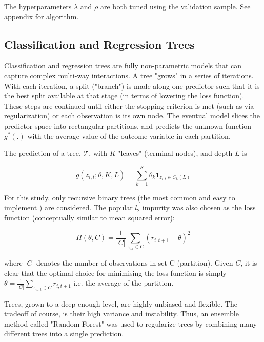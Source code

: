 \documentclass[man, a4paper, biblatex]{article}
\newcommand{\smalltodo}[2][] {\todo[caption={#2}, size=\scriptsize,%
	fancyline,#1]{\begin{spacing}{.5}#2\end{spacing}}}
\newcommand{\rhs}[2][]{\smalltodo[color=green!30,#1]{{\bf RS:} #2}}
\begin{document}
The hyperparameters $\lambda$ and $\rho$ are both tuned using the validation sample. See appendix for algorithm.

\rhs{update when algorithm is written}

\subsection{Classification and Regression Trees}

Classification and regression trees are fully non-parametric models that can capture complex multi-way interactions. A tree "grows" in a series of iterations. With each iteration, a split ("branch") is made along one predictor such that it is the best split available at that stage (in terms of lowering the loss function). These steps are continued until either the stopping criterion is met (such as via regularization) or each observation is its own node. The eventual model slices the predictor space into rectangular partitions, and predicts the unknown function $g^*(.)$ with the average value of the outcome variable in each partition.

The prediction of a tree, $\mathcal{T}$, with \(K\) "leaves" (terminal nodes), and depth $L$ is

\begin{equation}
	g(z_{i,t};\theta,K,L) = \sum_{k=1}^{K}\theta_k\textbf{1}_{z_{i,t}\in C_k(L)}
\end{equation}

For this study, only recursive binary trees (the most common and easy to implement ) are considered. The popular $l_2$ impurity was also chosen as the loss function (conceptually similar to mean squared error):

\begin{equation}
	H(\theta, C) = \frac{1}{|C|} \sum_{z_{i,t} \in C} (r_{i,t+1} - \theta)^2
\end{equation}

where $|C|$ denotes the number of observations in set C (partition). Given $C$, it is clear that the optimal choice for minimising the loss function is simply $\theta = \frac{1}{|C|} \sum_{z_{io,t}\in C}^{ }r_{i,t+1}$ i.e. the average of the partition.

Trees, grown to a deep enough level, are highly unbiased and flexible. The tradeoff of course, is their high variance and instability. Thus, an ensemble method called "Random Forest" was used to regularize trees by combining many different trees into a single prediction.
\end{document}
